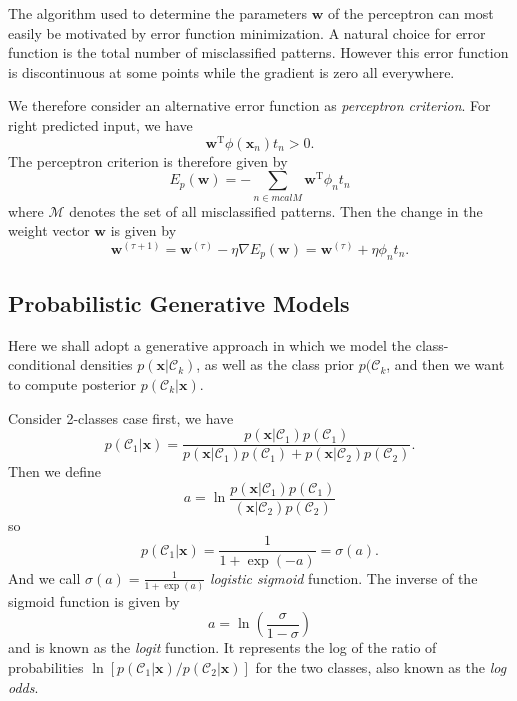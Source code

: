 \documentclass[a4paper]{book}
\newcommand{\mrm}{\mathrm}
\newcommand{\mbf}{\mathbf}
\newcommand{\mcal}{\mathcal}
\newcommand{\ww}{\mbf w}
\newcommand{\xx}{\mbf x}
\newcommand{\trans}{^{\mrm T}}
\begin{document}
The algorithm used to determine the parameters $\ww$ of the perceptron can most easily be motivated by error function minimization. A natural choice for error function is the total number of misclassified patterns. However this error function is discontinuous at some points while the gradient is zero all everywhere.

We therefore consider an alternative error function as \textit{perceptron criterion}. For right predicted input, we have
\begin{equation}\label{}
  \ww\trans\phi(\xx_n)t_n > 0.
\end{equation}
The perceptron criterion is therefore given by
\begin{equation}\label{}
  E_p(\ww)=-\sum_{n\in mcal M}\ww\trans\phi_nt_n
\end{equation}
where $\mcal M$ denotes the set of all misclassified patterns. Then the change in the weight vector $\ww$ is given by
\begin{equation}\label{}
  \ww^{(\tau+1)}=\ww^{(\tau)} - \eta\nabla E_p(\ww)=\ww^{(\tau)}+\eta\phi_nt_n.
\end{equation}

\subsection{Probabilistic Generative Models}
Here we shall adopt a generative approach in which we model the class-conditional densities $p(\xx|\mcal C_k)$, as well as the class prior $p(\mcal C_k$, and then we want to compute posterior $p(\mcal C_k|\xx)$.

Consider 2-classes case first, we have
\begin{equation}\label{}
  p(\mcal C_1|\xx) = \frac{p(\xx|\mcal C_1)p(\mcal C_1)}{p(\xx|\mcal C_1)p(\mcal C_1)+p(\xx|\mcal C_2)p(\mcal C_2)}.
\end{equation}
Then we define
\begin{equation}\label{}
  a = \ln\frac{p(\xx|\mcal C_1)p(\mcal C_1)}{(\xx|\mcal C_2)p(\mcal C_2)}
\end{equation}
so
\begin{equation}\label{eq2.3.1}
  p(\mcal C_1|\xx) = \frac{1}{1+\exp(-a)}=\sigma(a).
\end{equation}
And we call $\sigma(a) = \frac{1}{1+\exp(a)}$ \textit{logistic sigmoid} function. The inverse of the sigmoid function is given by
\begin{equation}\label{}
  a = \ln(\frac{\sigma}{1-\sigma})
\end{equation}
and is known as the \textit{logit} function. It represents the log of the ratio of probabilities $\ln [p(\mcal C_1|\xx)/p(\mcal C_2|\xx)]$ for the two classes, also known as the \textit{log odds}.
\end{document}

